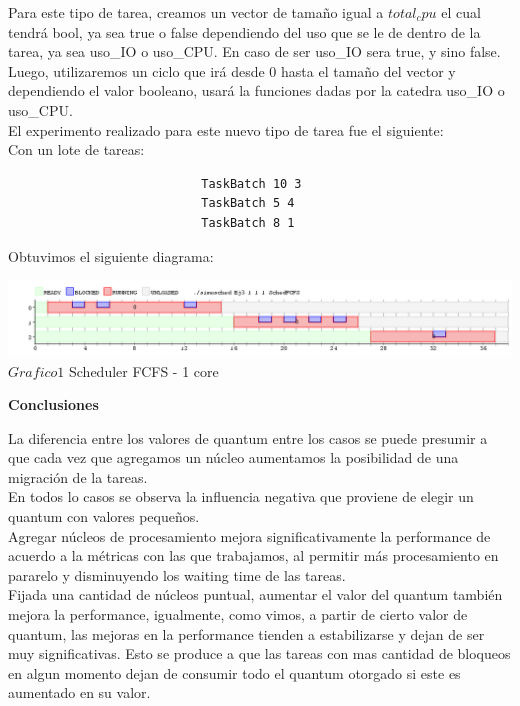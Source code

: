  \indent Para este tipo de tarea, creamos un vector de tamaño igual a $total_cpu$ el cual tendrá bool, ya sea true o false
 dependiendo del uso que se le de dentro de la tarea, ya sea uso\_IO o uso\_CPU. En caso de ser uso\_IO sera true, y sino false.\\
 Luego, utilizaremos un ciclo que irá desde 0 hasta el tamaño del vector y dependiendo el valor booleano, usará la funciones
 dadas por la catedra uso\_IO o uso\_CPU.\\
 
 \indent El experimento realizado para este nuevo tipo de tarea fue el siguiente:\\
 
 Con un lote de tareas:\\
 
 \begin{verbatim}
                           TaskBatch 10 3
                           TaskBatch 5 4
                           TaskBatch 8 1
 \end{verbatim}

 Obtuvimos el siguiente diagrama:\\
 
 \vspace*{0.3cm} \vspace*{0.3cm}
  \begin{center}
 \includegraphics[scale=0.5]{./Test/ej3.png}
 { $Grafico 1$ Scheduler FCFS - 1 core }
 \end{center}
  \vspace*{0.3cm}
 
 
  \begin{center}
  \textbf{Conclusiones}
 \end{center}


\indent \indent La diferencia entre los valores de quantum entre los casos 
se puede presumir a que cada vez que agregamos un núcleo aumentamos 
la posibilidad de una migración de la tareas.\\
\indent \indent En todos lo casos se observa la influencia negativa que proviene 
de elegir un quantum con valores pequeños.\\
\indent \indent Agregar núcleos de procesamiento mejora significativamente 
la performance de acuerdo a la métricas con las que
trabajamos, al permitir más procesamiento en pararelo y disminuyendo 
los waiting time de las tareas.\\
\indent \indent  Fijada una cantidad de núcleos puntual, aumentar el valor del
quantum también mejora la performance, igualmente, como vimos, a partir de cierto valor 
de quantum, las mejoras en la performance tienden a estabilizarse y dejan de ser 
muy significativas. 
Esto se produce a que las tareas con mas cantidad de bloqueos en 
algun momento dejan de consumir todo el quantum otorgado si este es aumentado en su valor.
